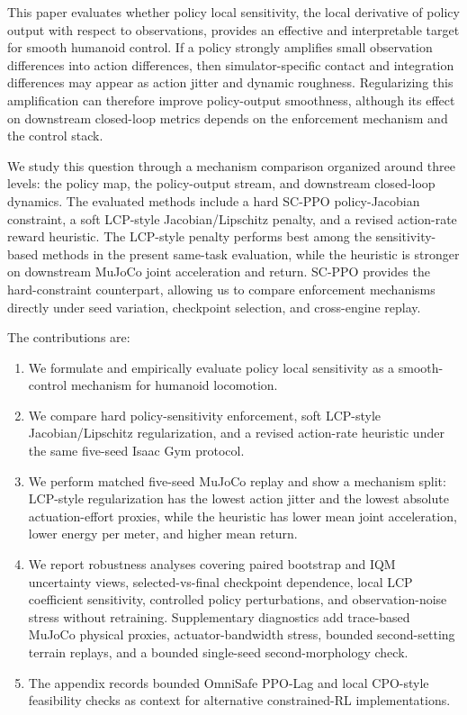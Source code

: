 \documentclass[10pt]{article}
\begin{document}
This paper evaluates whether policy local sensitivity, the local derivative of
policy output with respect to observations, provides an effective and
interpretable target for smooth humanoid control. If a policy strongly amplifies
small observation differences into action differences, then simulator-specific
contact and integration differences may appear as action jitter and dynamic
roughness. Regularizing this amplification can therefore improve policy-output
smoothness, although its effect on downstream closed-loop metrics depends on the
enforcement mechanism and the control stack.

We study this question through a mechanism comparison organized around three
levels: the policy map, the policy-output stream, and downstream closed-loop
dynamics. The evaluated methods
include a hard SC-PPO policy-Jacobian constraint, a soft LCP-style
Jacobian/Lipschitz penalty, and a revised action-rate reward heuristic. The
LCP-style penalty performs best among the sensitivity-based methods in the
present same-task evaluation, while the heuristic is stronger on downstream
MuJoCo joint acceleration and return. SC-PPO provides the hard-constraint
counterpart, allowing us to compare enforcement mechanisms directly under seed
variation, checkpoint selection, and cross-engine replay.

The contributions are:
\begin{enumerate}
  \item We formulate and empirically evaluate policy local sensitivity as a
  smooth-control mechanism for humanoid locomotion.
  \item We compare hard policy-sensitivity enforcement, soft
  LCP-style Jacobian/Lipschitz regularization, and a revised action-rate
  heuristic under the same five-seed Isaac Gym protocol.
  \item We perform matched five-seed MuJoCo replay and show a mechanism split:
  LCP-style regularization has the lowest action jitter and the lowest
  absolute actuation-effort proxies, while the heuristic has lower mean joint
  acceleration, lower energy per meter, and higher mean return.
  \item We report robustness analyses covering paired bootstrap and IQM
  uncertainty views, selected-vs-final checkpoint dependence, local LCP
  coefficient sensitivity, controlled policy perturbations, and
  observation-noise stress without retraining. Supplementary diagnostics add
  trace-based MuJoCo physical proxies, actuator-bandwidth stress, bounded
  second-setting terrain replays, and a bounded single-seed second-morphology
  check.
  \item The appendix records bounded OmniSafe PPO-Lag and local CPO-style
  feasibility checks as context for alternative constrained-RL
  implementations.
\end{enumerate}
\end{document}
